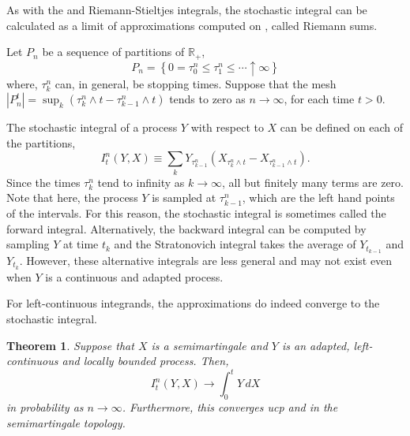 \documentclass[12pt]{article}
\newtheorem{theorem}{Theorem}
\begin{document}

As with the  and Riemann-Stieltjes integrals, the stochastic integral can be calculated as a limit of approximations computed on , called Riemann sums.

Let $P_n$ be a sequence of partitions of $\mathbb{R}_+$,
\begin{equation*}
P_n=\left\{0=\tau^n_0\le\tau^n_1\le\cdots\uparrow\infty\right\}
\end{equation*}
where, $\tau^n_k$ can, in general, be stopping times. Suppose that the mesh $|P_n^t|=\sup_k(\tau^n_k\wedge t-\tau^n_{k-1}\wedge t)$ tends to zero  as $n\rightarrow\infty$, for each time $t>0$.

The stochastic integral of a process $Y$ with respect to $X$ can be defined on each of the partitions,
\begin{equation*}
I^n_t(Y,X)\equiv\sum_k Y_{\tau^n_{k-1}}(X_{\tau^n_k\wedge t}-X_{\tau^n_{k-1}\wedge t}).
\end{equation*}
Since the times $\tau^n_k$ tend to infinity as $k\rightarrow\infty$, all but finitely many terms are zero.
Note that here, the process $Y$ is sampled at $\tau^n_{k-1}$, which are the left hand points of the intervals. For this reason, the stochastic integral is sometimes called the forward integral. Alternatively, the backward integral can be computed by sampling $Y$ at time $t_k$ and the Stratonovich integral takes the average of $Y_{t_{k-1}}$ and $Y_{t_k}$. However, these alternative integrals are less general and may not exist even when $Y$ is a continuous and adapted process.

For left-continuous integrands, the approximations do indeed converge to the stochastic integral.

\begin{theorem}
Suppose that $X$ is a semimartingale and $Y$ is an adapted, left-continuous and locally bounded process. Then,
\begin{equation*}
I^n_t(Y,X)\rightarrow\int_0^t Y\,dX
\end{equation*}
in probability as $n\rightarrow\infty$. Furthermore, this converges ucp and in the semimartingale topology.
\end{theorem}
\end{document}
